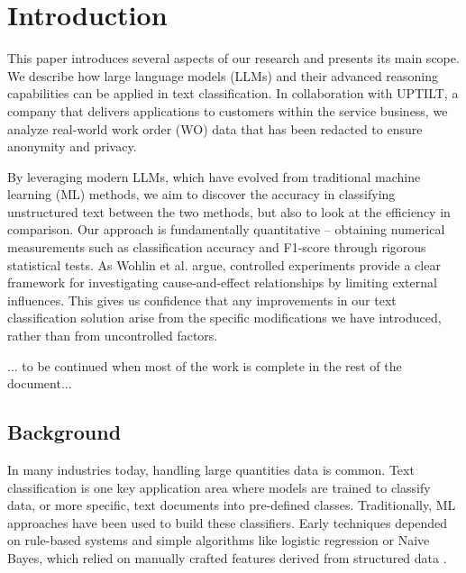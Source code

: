 \section{Introduction}

This paper introduces several aspects of our research and presents its main scope. We describe how large language models (LLMs) and their advanced reasoning capabilities can be applied in text classification. In collaboration with UPTILT, a company that delivers applications to customers within the service business, we analyze real-world work order (WO) data that has been redacted to ensure anonymity and privacy.

By leveraging modern LLMs, which have evolved from traditional machine learning (ML) methods, we aim to discover the accuracy in classifying unstructured text between the two methods, but also to look at the efficiency in comparison. Our approach is fundamentally quantitative -- obtaining numerical measurements such as classification accuracy and F1-score through rigorous statistical tests. As Wohlin et al. \cite{wohlin2000software} argue, controlled experiments provide a clear framework for investigating cause-and-effect relationships by limiting external influences. This gives us confidence that any improvements in our text classification solution arise from the specific modifications we have introduced, rather than from uncontrolled factors.

... to be continued when most of the work is complete in the rest of the document...

\subsection{Background}

In many industries today, handling large quantities data is common. Text classification is one key application area where models are trained to classify data, or more specific, text documents into pre-defined classes. Traditionally, ML approaches have been used to build these classifiers. Early techniques depended on rule-based systems and simple algorithms like logistic regression or Naive Bayes, which relied on manually crafted features derived from structured data \cite{bing2011mining}. 

